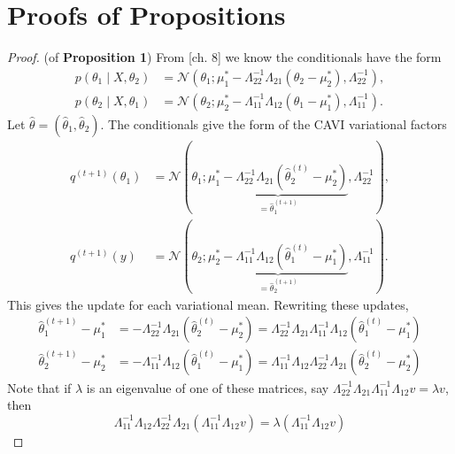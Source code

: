 \documentclass{article}
\begin{document}
\newpage

\appendix

\section{Proofs of Propositions}

\begin{proof} (of {\bf Proposition 1}) From \cite{Barber} [ch. 8] we know the conditionals have the form 
\begin{align}
p(\theta_1\mid X,\theta_2) 
&= \mathcal N(\theta_1; \mu_1^*-\Lambda_{22}^{-1}\Lambda_{21}(\theta_2-\mu_2^*),\Lambda_{22}^{-1}), \\
p(\theta_2\mid X,\theta_1) 
&= \mathcal N(\theta_2; \mu_2^*-\Lambda_{11}^{-1}\Lambda_{12}(\theta_1-\mu_1^*),\Lambda_{11}^{-1}).
\end{align}
Let $\widehat\theta = (\widehat\theta_1,\widehat\theta_2)$. The conditionals give the form of the CAVI variational factors \cite{Blei}
\begin{align}
q^{(t+1)}(\theta_1) &= 
\mathcal N(\theta_1; \underbrace{\mu_1^*-\Lambda_{22}^{-1}\Lambda_{21}(\widehat\theta_2^{(t)}-\mu_2^*)}_{=\widehat\theta_1^{(t+1)}},\Lambda_{22}^{-1}), \\
q^{(t+1)}(y) 
&= \mathcal N(\theta_2; \underbrace{\mu_2^*-\Lambda_{11}^{-1}\Lambda_{12}(\widehat\theta_1^{(t)}-\mu_1^*)}_{=\widehat\theta_2^{(t+1)}},\Lambda_{11}^{-1}).
\end{align}
This gives the update for each variational mean. Rewriting these updates,
\begin{align}
\widehat\theta_1^{(t+1)} - \mu_1^*  
&= -\Lambda_{22}^{-1}\Lambda_{21}(\widehat\theta_2^{(t)}-\mu_2^*)
=\Lambda_{22}^{-1}\Lambda_{21}\Lambda_{11}^{-1}\Lambda_{12}(\widehat\theta_1^{(t)}-\mu_1^*) \\
\widehat\theta_2^{(t+1)} - \mu_2^*  
&= -\Lambda_{11}^{-1}\Lambda_{12}(\widehat\theta_1^{(t)}-\mu_1^*)
=\Lambda_{11}^{-1}\Lambda_{12}\Lambda_{22}^{-1}\Lambda_{21}(\widehat\theta_2^{(t)}-\mu_2^*)
\end{align}
Note that if $\lambda$ is an eigenvalue of one of these matrices, say $\Lambda_{22}^{-1}\Lambda_{21}\Lambda_{11}^{-1}\Lambda_{12} v = \lambda v$, then 
$$
\Lambda_{11}^{-1}\Lambda_{12}\Lambda_{22}^{-1}\Lambda_{21}(\Lambda_{11}^{-1}\Lambda_{12} v) = \lambda (\Lambda_{11}^{-1}\Lambda_{12}v)
$$
\end{proof}
\end{document}

